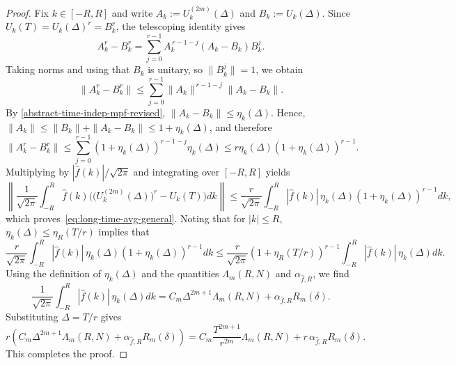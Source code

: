 \documentclass[10pt,reqno]{article}
\numberwithin{equation}{section}
\theoremstyle{plain}
\theoremstyle{definition}
\begin{document}
\begin{proof}
Fix \(k\in[-R,R]\) and write \(A_k:=U_k^{(2m)}(\Delta)\) and \(B_k:=U_k(\Delta)\). Since \(U_k(T)=U_k(\Delta)^r=B_k^r\), the telescoping identity gives
\begin{equation}
A_k^r-B_k^r = \sum_{j=0}^{r-1} A_k^{\,r-1-j}(A_k-B_k)B_k^j.
\end{equation}
Taking norms and using that \(B_k\) is unitary, so \(\|B_k^j\|=1\), we obtain
\begin{equation}
\|A_k^r-B_k^r\| \le \sum_{j=0}^{r-1}\|A_k\|^{\,r-1-j}\|A_k-B_k\|.
\end{equation}
By \cref{abstract-time-indep-mpf-revised}, \(\|A_k-B_k\|\leq\eta_k(\Delta)\). Hence, \(\|A_k\|\leq \|B_k\|+\|A_k-B_k\|\leq 1+\eta_k(\Delta)\), and therefore
\begin{equation}
\|A_k^r-B_k^r\| \le \sum_{j=0}^{r-1} (1+\eta_k(\Delta) )^{r-1-j}\eta_k(\Delta) \le r\eta_k(\Delta) (1+\eta_k(\Delta) )^{r-1}.
\end{equation}
Multiplying by $|\hat f(k)|/\sqrt{2 \pi}$ and integrating over $[-R,R]$ yields
\begin{equation}
\left\| \frac{1}{\sqrt{2\pi}} \int_{-R}^{R} \hat f(k)\Big(\big(U_k^{(2m)}(\Delta)\big)^r-U_k(T)\Big)dk \right\| \le \frac{r}{\sqrt{2\pi}}\int_{-R}^{R} |\hat f(k)|\,\eta_k(\Delta) (1+\eta_k(\Delta) )^{r-1}dk,
\end{equation}
which proves~\cref{eq:long-time-avg-general}. Noting that for $|k|\le R$, $\eta_k(\Delta)\le \eta_{R}(T/r)$ implies that
\begin{equation}
\frac{r}{\sqrt{2\pi}}\int_{-R}^{R} |\hat f(k)|\,\eta_k(\Delta) (1+\eta_k(\Delta) )^{r-1}dk \le \frac{r}{\sqrt{2\pi}} (1+\eta_{R}(T/r) )^{r-1} \int_{-R}^{R} |\hat f(k)|\,\eta_k(\Delta)dk.
\end{equation}
Using the definition of $\eta_k(\Delta)$ and the quantities $\Lambda_m(R,N)$ and $\alpha_{\hat f, R}$, we find
\begin{equation}
\frac{1}{\sqrt{2\pi}} \int_{-R}^{R} |\hat f(k)|\,\eta_k(\Delta)dk = C_m \Delta^{2m+1}\Lambda_m(R,N)+\alpha_{\hat f, R} R_m(\delta).
\end{equation}
Substituting $\Delta=T/r$ gives
\begin{equation}
r \left( C_m \Delta^{2m+1}\Lambda_m(R,N)+\alpha_{\hat f, R} R_m(\delta) \right) = C_m\frac{T^{2m+1}}{r^{2m}}\Lambda_m(R,N) + r\,\alpha_{\hat f, R} R_m(\delta).
\end{equation}
This completes the proof.
\end{proof}
\end{document}
